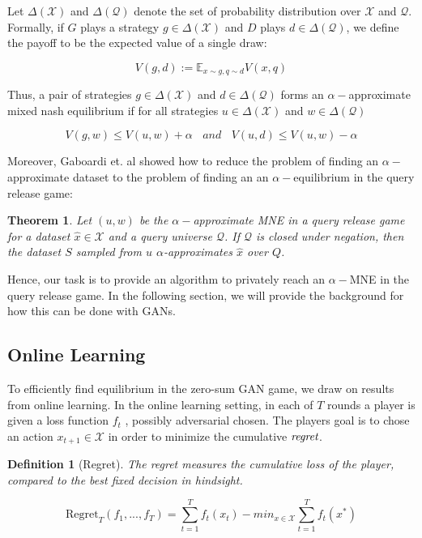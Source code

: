\documentclass[]{article}
\newcommand{\X}{\mathcal{X}}
\newcommand{\Q}{\mathcal{Q}}
\newtheorem{definition}{Definition}[section]
\newtheorem{theorem}{Theorem}[section]
\theoremstyle{definition}
\begin{document}
Let $\Delta(\X)$ and $\Delta(\Q)$ denote the set of probability distribution over $\X$ and $\Q$. Formally, if $G$ plays a strategy $g \in \Delta(\X)$ and $D$ plays  $d \in \Delta(\Q)$, we define the payoff to be the expected value of a single draw:

\begin{equation}
    V(g,d) := \mathbb{E}_{x \sim g, q \sim d} V(x,q)
\end{equation}

Thus, a pair of strategies $g \in \Delta(\X)$ and $d \in \Delta(\Q)$ forms an $\alpha-$approximate mixed nash equilibrium if for all strategies $u \in \Delta(\X)$ and $w \in \Delta(\Q)$

\begin{equation}
    V(g, w) \leq V(u,w) + \alpha ~~~~ and ~~~~ V(u, d) \leq V(u,w) - \alpha 
\end{equation}

Moreover, Gaboardi et. al showed how to reduce the problem of finding an $\alpha-$approximate dataset to the problem of finding an an $\alpha-$equilibrium in the query release game:

\begin{theorem}
    Let $(u,w)$ be the $\alpha-$approximate MNE in a query release game for a dataset $\hat x \in \X$ and a query universe $\Q$. If $\Q$ is closed under negation, then the dataset $S$ sampled from $u$ $\alpha$-approximates $\hat x$ over $Q$. \cite{GAH+14}
\end{theorem}


Hence, our task is to provide an algorithm to privately reach an $\alpha-$MNE in the query release game. In the following section, we will provide the background for how this can be done with GANs.

\subsection{Online Learning}

To efficiently find equilibrium in the zero-sum GAN game, we draw on results from online learning. In the online learning setting, in each of $T$ rounds a player is given a loss function $f_t$ , possibly adversarial chosen. The players goal is to chose an action $x_{t+1} \in \mathcal{X}$ in order to minimize the cumulative $\emph{regret}$. 

\begin{definition}[Regret]
    The regret measures the cumulative loss of the player, compared to the best fixed decision in hindsight. 

    \begin{equation}
        \text{Regret}_T(f_1,...,f_T) = \sum_{t=1}^T f_t(x_t) - min_{x \in \mathcal{X}} \sum_{t=1}^T f_t(x^*)
    \end{equation}
\end{definition}
\end{document}
